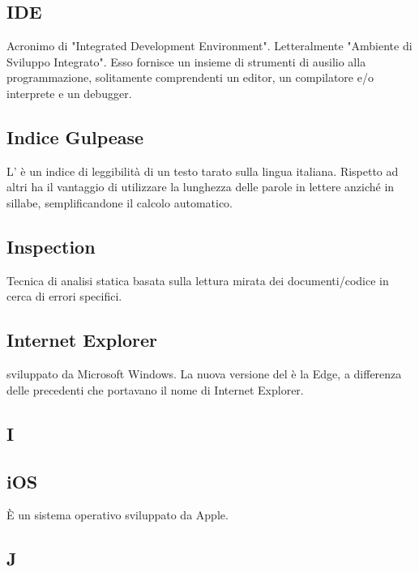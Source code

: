 \subsection{IDE}
Acronimo di "Integrated Development Environment". Letteralmente "Ambiente
di Sviluppo Integrato". Esso fornisce un insieme di strumenti di ausilio
alla programmazione, solitamente comprendenti un editor, un compilatore e/o
interprete e un debugger.

\subsection{Indice Gulpease}
L' è un indice di leggibilità di un testo tarato sulla lingua
italiana. Rispetto ad altri ha il vantaggio di utilizzare la lunghezza delle parole in lettere
anziché in sillabe, semplificandone il calcolo automatico.

\subsection{Inspection }
Tecnica di analisi statica basata sulla lettura mirata dei documenti/codice in cerca di
errori specifici.

\subsection{Internet Explorer}
  sviluppato da Microsoft Windows. La nuova versione del  è la Edge, a differenza delle precedenti che portavano il nome di Internet Explorer.

\newpage

\begin{center}
\Huge\section{\uppercase{i}}
\end{center}

\subsection{iOS}
È un sistema operativo sviluppato da Apple.

\newpage

\begin{center}
\Huge\section{\uppercase{J}}
\end{center}


